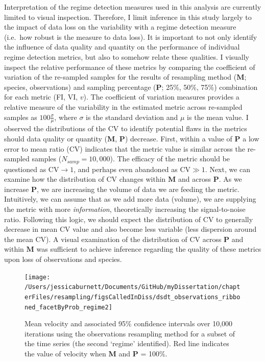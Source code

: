 \documentclass[12pt,twoside,openany]{reedthesis}
\begin{document}
Interpretation of the regime detection measures used in this analysis are currently limited to visual inspection. Therefore, I limit inference in this study largely to the impact of data loss on the variability with a regime detection measure (i.e.~how robust is the measure to data loss). It is important to not only identify the influence of data quality and quantity on the performance of individual regime detection metrics, but also to somehow relate these qualities. I visually inspect the relative performance of these metrics by comparing the coefficient of variation of the re-sampled samples for the results of resampling method (\(\textbf{M}\); species, observations) and sampling percentage (\(\textbf{P}\); 25\%, 50\%, 75\%) combination for each metric (FI, VI, \(v\)). The coefficient of variation measures provides a relative measure of the variability in the estimated metric across re-sampled samples as \(100\frac{\sigma}{\mu}\), where \(\sigma\) is the standard deviation and \(\mu\) is the mean value.
I observed the distributions of the CV to identify potential flaws in the metrics should data quality or quantity (\(\textbf{M}\), \(\textbf{P}\)) decrease. First, within a value of \(\textbf{P}\) a low error to mean ratio (CV) indicates that the metric value is similar across the re-sampled samples (\(N_{samp}=10,000\)). The efficacy of the metric should be questioned as CV\(\rightarrow 1\), and perhaps even abandoned as CV\(\gg1\). Next, we can examine how the distribution of CV changes within \(\textbf{M}\) and across \(\textbf{P}\). As we increase \(\textbf{P}\), we are increasing the volume of data we are feeding the metric. Intuitively, we can assume that as we add more data (volume), we are supplying the metric with more \emph{information}, theoretically increasing the signal-to-noise ratio. Following this logic, we should expect the distribution of CV to generally decrease in mean CV value and also become less variable (less dispersion around the mean CV). A visual examination of the distribution of CV across \(\textbf{P}\) and within \(\textbf{M}\) was sufficient to achieve inference regarding the quality of these metrics upon loss of observations and species.\\

\begin{figure}[bth]

{\centering \texttt{[image: /Users/jessicaburnett/Documents/GitHub/myDissertation/chapterFiles/resampling/figsCalledInDiss/dsdt\_observations\_ribboned\_facetByProb\_regime2]} 

}

\caption{Mean velocity and associated 95\% confidence intervals over 10,000 iterations using the observations resampling method for a subset of the time series (the second `regime' identified). Red line indicates the value of velocity when \textbf{M} and \textbf{P} = 100\%.}\label{fig:dsdtResampRegime2}
\end{figure}
\end{document}
